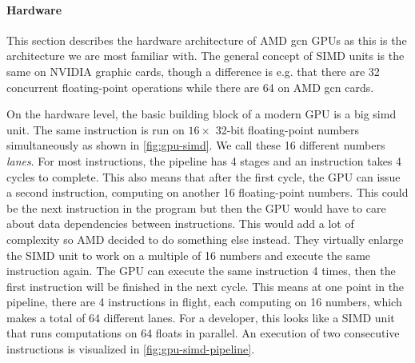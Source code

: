 \paragraph{Hardware} This section describes the hardware architecture of AMD \gls{gcn} GPUs as this is the architecture we are most familiar with. The general concept of SIMD units is the same on NVIDIA graphic cards, though a difference is e.g. that there are 32 concurrent floating-point operations while there are 64 on AMD \gls{gcn} cards.

\begin{figure}
\centering
\begin{minipage}[t]{.5\textwidth}
	\centering
	
\end{minipage}%
\begin{minipage}[t]{.5\textwidth}
	\centering
	
\end{minipage}
\end{figure}
On the hardware level, the basic building block of a modern GPU is a big \gls{simd} unit. The same instruction is run on $16 \times$ 32-bit floating-point numbers simultaneously as shown in \cref{fig:gpu-simd}. We call these 16 different numbers \emph{lanes}. For most instructions, the pipeline has 4 stages and an instruction takes 4 cycles to complete. This also means that after the first cycle, the GPU can issue a second instruction, computing on another 16 floating-point numbers. This could be the next instruction in the program but then the GPU would have to care about data dependencies between instructions. This would add a lot of complexity so AMD decided to do something else instead. They virtually enlarge the SIMD unit to work on a multiple of 16 numbers and execute the same instruction again. The GPU can execute the same instruction 4 times, then the first instruction will be finished in the next cycle. This means at one point in the pipeline, there are 4 instructions in flight, each computing on 16 numbers, which makes a total of 64 different lanes. For a developer, this looks like a SIMD unit that runs computations on 64 floats in parallel. An execution of two consecutive instructions is visualized in \cref{fig:gpu-simd-pipeline}.

